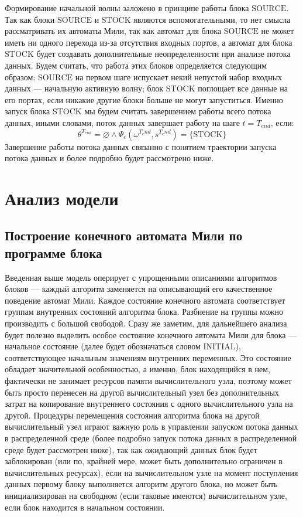 \documentclass[10pt,a4paper]{article}
\newcommand{\stock}{\text{STOCK}}
\newcommand{\source}{\text{SOURCE}}
\newcommand{\initial}{\text{INITIAL}}
\begin{document}
  Формирование начальной волны заложено в принципе работы блока $\source$.
  Так как блоки $\source$ и $\stock$ являются вспомогательными, то нет смысла рассматривать их автоматы Мили, так как автомат для блока $\source$ не может иметь ни одного перехода
  из-за отсутствия входных портов, а автомат для блока $\stock$ будет создавать дополнительные неопределенности при анализе потока данных.
  Будем считать, что работа этих блоков определяется следующим образом: $\source$ на первом шаге испускает некий непустой набор входных данных --- начальную активную волну;
  блок $\stock$ поглощает все данные на его портах, если никакие другие блоки больше не могут запуститься. Именно запуск блока $\stock$ мы будем считать завершением работы
  всего потока данных, иными словами, поток данных завершает работу на шаге $t = T_{end}$, если:
  \begin{equation}
    \theta^{T_{end}} = \varnothing \wedge \Psi_c(\omega^{T_end}, s^{T_end}) = \{\stock\}
    \label{end_of_workflow}
  \end{equation}
  Завершение работы потока данных связанно с понятием траектории запуска потока данных и более подробно будет рассмотрено ниже.

\section{Анализ модели}
\subsection{Построение конечного автомата Мили по программе блока}
Введенная выше модель оперирует с упрощенными описаниями алгоритмов блоков --- каждый алгоритм заменяется на описывающий его качественное поведение автомат Мили.
Каждое состояние конечного автомата соответствует группам внутренних состояний алгоритма блока. Разбиение на группы можно производить с большой свободой.
Сразу же заметим, для дальнейшего анализа будет полезно выделить особое состояние конечного автомата Мили для блока --- начальное состояние (далее будет обозначаться словом $\initial$), соответствующее начальным значениям внутренних переменных. Это состояние обладает значительной особенностью, а именно, блок находящийся в нем, фактически
не занимает ресурсов памяти вычислительного узла, поэтому может быть просто перенесен на другой вычислительный узел без дополнительных затрат
на копирование внутреннего состояния с одного вычислительного узла на другой. Процедуры перемещения состояния алгоритма блока на другой
вычислительный узел играют важную роль в управлении запуском потока данных в распределенной среде (более подробно запуск потока данных в распределенной среде будет рассмотрен ниже), так как ожидающий данных блок будет заблокирован (или по, крайней мере, может быть дополнительно ограничен в вычислительных ресурсах),
если на вычислительном узле на момент поступления данных первому блоку выполняется алгоритм другого блока, но может быть инициализирован на свободном
(если таковые имеются) вычислительном узле, если блок находится в начальном состоянии.
\end{document}
